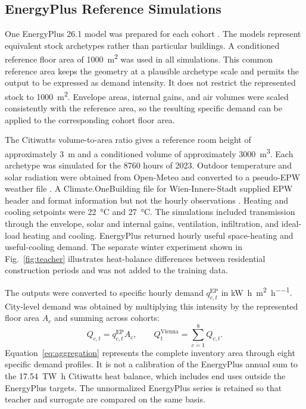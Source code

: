 \documentclass[10pt,twocolumn]{article}
\begin{document}
\subsection{EnergyPlus Reference Simulations}

One EnergyPlus 26.1 model was prepared for each cohort
\cite{doe2026}. The models represent equivalent stock archetypes rather than
particular buildings. A conditioned reference floor area of
\SI{1000}{\metre\squared} was used in all simulations. This common reference
area keeps the geometry at a plausible archetype scale and permits the output
to be expressed as demand intensity. It does not restrict the represented
stock to \SI{1000}{\metre\squared}. Envelope areas, internal gains, and air
volumes were scaled consistently with the reference area, so the resulting
specific demand can be applied to the corresponding cohort floor area.

The Citiwatts volume-to-area ratio gives a reference room height of
approximately \SI{3}{\metre} and a conditioned volume of approximately
\SI{3000}{\metre\cubed}. Each archetype was simulated for the 8760 hours of
2023. Outdoor temperature and solar radiation were obtained from Open-Meteo
and converted to a pseudo-EPW weather file \cite{zippenfenig2023}. A
Climate.OneBuilding file for Wien-Innere-Stadt supplied EPW header and format
information but not the hourly observations \cite{climateonebuilding}.
Heating and cooling setpoints were \SI{22}{\degreeCelsius} and
\SI{27}{\degreeCelsius}. The simulations included transmission through the
envelope, solar and internal gains, ventilation, infiltration, and ideal-load
heating and cooling. EnergyPlus returned hourly useful space-heating and
useful-cooling demand. The separate winter experiment shown in
Fig.~\ref{fig:teacher} illustrates heat-balance differences between
residential construction periods and was not added to the training data.

The outputs were converted to specific hourly demand
$q_{c,t}^{\mathrm{EP}}$ in \si{\kilo\watt\hour\per\metre\squared\per\hour}.
City-level demand was obtained by multiplying this intensity by the represented
floor area $A_c$ and summing across cohorts:
\begin{equation}
Q_{c,t}=q_{c,t}^{\mathrm{EP}}A_c,\qquad
Q_t^{\mathrm{Vienna}}=\sum_{c=1}^{8}Q_{c,t}.
\label{eq:aggregation}
\end{equation}
Equation~\eqref{eq:aggregation} represents the complete inventory area through
eight specific demand profiles. It is not a calibration of the EnergyPlus
annual sum to the \SI{17.54}{\tera\watt\hour} Citiwatts heat balance, which
includes end uses outside the EnergyPlus targets. The unnormalized EnergyPlus
series is retained so that teacher and surrogate are compared on the same
basis.
\end{document}
